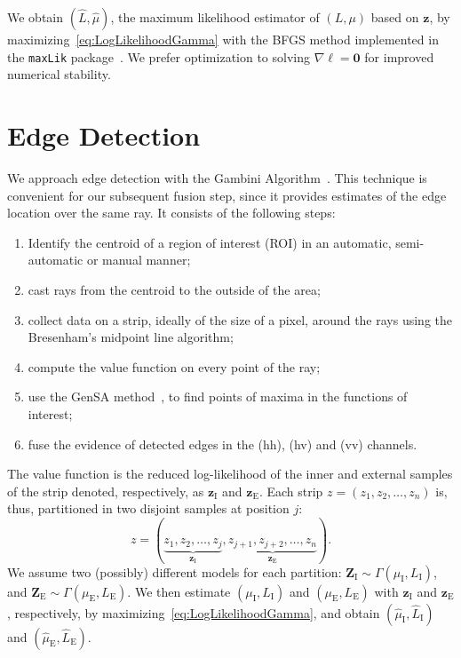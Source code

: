 \documentclass[journal]{IEEEtran}
\begin{document}
We obtain $(\widehat L, \widehat \mu)$, the maximum likelihood estimator of $(L, \mu)$ based on $\bm z$, by maximizing~\eqref{eq:LogLikelihoodGamma} with the BFGS method implemented in the \texttt{maxLik} package~\cite{ht}.
We prefer optimization to solving $\nabla\ell=\bm 0$ for improved numerical stability.

\section{Edge Detection}\label{sec_03}

We approach edge detection with the Gambini Algorithm~\cite{gmbf, fbgm, nhfc}.
This technique is convenient for our subsequent fusion step, since it provides estimates of the edge location over the same ray.
It consists of the following steps:
\begin{enumerate}
	\item Identify the centroid of a region of interest (ROI) in an automatic, semi-automatic or manual manner;
	\item cast rays from the centroid to the outside of the area;
	\item collect data on a strip, ideally of the size of a pixel, around the rays using the  Bresenham's midpoint line algorithm;
	\item compute the value function on every point of the ray;
	\item use the GenSA method~\cite{xgsh}, to find points of maxima in the functions of interest;
	\item fuse the evidence of detected edges in the (hh), (hv) and (vv) channels.
\end{enumerate}

The value function is the reduced log-likelihood of the inner and external samples of the strip denoted, respectively, as $\bm z_\text{I}$ and $\bm z_\text{E}$.
Each strip $z = (z_1,z_2,\dots,z_n)$ is, thus, partitioned in two disjoint samples at position $j$:
$$
z = (\underbrace{z_1,z_2,\dots,z_j}_{\bm z_\text{I}}, 
\underbrace{z_{j+1}, z_{j+2},\dots,z_n}_{\bm z_\text{E}}).
$$
We assume two (possibly) different models for each partition:
$\bm Z_\text{I} \sim \Gamma(\mu_\text{I},L_\text{I})$, and 
$\bm Z_\text{E} \sim \Gamma(\mu_\text{E},L_\text{E})$.
We then estimate $(\mu_\text{I},L_\text{I})$ and $(\mu_\text{E},L_\text{E})$ with $\bm z_\text{I}$ and $\bm z_\text{E}$, respectively, by maximizing~\eqref{eq:LogLikelihoodGamma}, and obtain $(\widehat{\mu}_\text{I}, \widehat{L}_\text{I})$ and $(\widehat{\mu}_\text{E}, \widehat{L}_\text{E})$.
\end{document}
